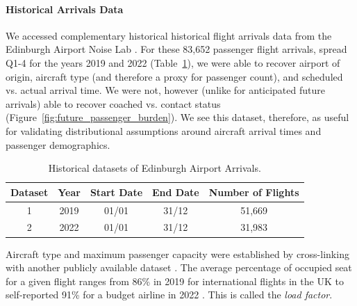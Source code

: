 \documentclass[10pt]{article}
\begin{document}
\paragraph{Historical Arrivals Data}
We accessed complementary historical historical flight arrivals data from the Edinburgh Airport Noise Lab \cite{noise_lab}. For these 83,652 passenger flight arrivals, spread Q1-4 for the years 2019 and 2022 (Table~\ref{tab:observed_arrivals_overview}), we were able to recover airport of origin, aircraft type (and therefore a proxy for passenger count), and scheduled vs. actual arrival time. We were not, however (unlike for anticipated future arrivals) able to recover coached vs. contact status (Figure~\ref{fig:future_passenger_burden}). We see this dataset, therefore, as useful for validating distributional assumptions around aircraft arrival times and passenger demographics. 
\begin{table}[!ht]
\caption{Historical datasets of Edinburgh Airport Arrivals.}
\label{tab:observed_arrivals_overview}
\centering
\begin{tabular}{ccccc}
\hline
\multicolumn{1}{c}{\textbf{Dataset}} & \textbf{Year} & \textbf{Start Date} & \textbf{End Date} & \textbf{Number of Flights} \\ \hline
1  & 2019  & 01/01  & 31/12    &  51,669  \\
2  & 2022  & 01/01  & 31/12    &  31,983  \\
 \hline
\end{tabular}
\end{table}
Aircraft type and maximum passenger capacity were established by cross-linking with another publicly available dataset \cite{aircraft_capacity}. The average percentage of occupied seat for a given flight ranges from 86\% in 2019 for international flights in the UK \cite{loading_factor_national} to self-reported 91\% for a budget airline in 2022 \cite{loading_factor_ryanair}. This is called the \textit{load factor}.
\end{document}
